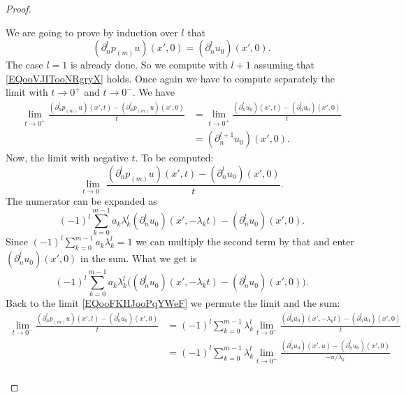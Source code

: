 \begin{proof}
\begin{subproof}
		We are going to prove by induction over \( l\) that
		\begin{equation}        \label{EQooVJITooNRgryX}
			(\partial_n^lp_{(m)}u)(x',0)=(\partial_n^lu_0)(x',0).
		\end{equation}
		The case \( l=1\) is already done. So we compute with \( l+1\) assuming that \eqref{EQooVJITooNRgryX} holds. Once again we have to compute separately the limit with \( t\to 0^+\) and \( t\to 0^-\). We have
		\begin{subequations}
			\begin{align}
				\lim_{t\to 0^+} \frac{ (\partial_n^lp_{(m)}u)(x',t)-(\partial_n^lp_{(m)}u)(x',0) }{ t } & =\lim_{t\to 0^+} \frac{   (\partial_n^lu_0)(x',t)-  (\partial_n^lu_0)(x',0) }{ t } \\
				                                                                                        & =(\partial^{l+1}_nu_0)(x',0).
			\end{align}
		\end{subequations}
		Now, the limit with negative \( t\). To be computed:
		\begin{equation}    \label{EQooFKHJooPqYWeF}
			\lim_{t\to 0^-} \frac{ (\partial^l_np_{(m)}u)(x',t)-(\partial_n^lu_0)(x',0) }{ t }.
		\end{equation}
		The numerator can be expanded as
		\begin{equation}
			(-1)^l\sum_{k=0}^{m-1}a_k\lambda_k^l(\partial_n^lu_0)(x',-\lambda_kt)-(\partial_n^lu_0)(x',0).
		\end{equation}
		Since \( (-1)^l\sum_{k=0}^{m-1}a_k\lambda_k^l=1\) we can multiply the second term by that and enter \( (\partial_n^lu_0)(x',0)\) in the sum. What we get is
		\begin{equation}
			(-1)^l\sum_{k=0}^{m-1}a_k\lambda_k^l\big( (\partial_n^lu_0)(x',-\lambda_k t)-(\partial_{n}^lu_0)(x',0) \big).
		\end{equation}
		Back to the limit \eqref{EQooFKHJooPqYWeF} we permute the limit and the sum:
		\begin{subequations}
			\begin{align}
				\lim_{t\to 0^-} \frac{ (\partial^l_np_{(m)}u)(x',t)-(\partial_n^lu_0)(x',0) }{ t } & =(-1)^l\sum_{k=0}^{m-1}\lambda_k^l\lim_{t\to 0^-} \frac{ (\partial_n^lu_0)(x',-\lambda_kt)-(\partial_n^lu_0)(x',0) }{ t }        \\
				                                                                                   & =(-1)^l\sum_{k=0}^{m-1}\lambda_k^l\lim_{t\to 0^+} \frac{    (\partial_n^lu_0)(x',u)- (\partial_n^lu_0)(x',0)   }{ -u/\lambda_k } \\

\end{align}
\end{subequations}
\end{subproof}
\end{proof}
